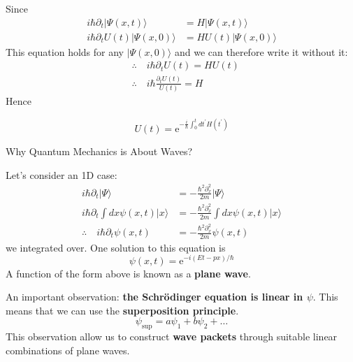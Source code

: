 Since
$$
\begin{aligned}
i \hbar \partial_{t}|\Psi(x, t)\rangle &= H|\Psi(x, t)\rangle \\
i \hbar \partial_{t} U(t)|\Psi(x, 0)\rangle &= H U(t)|\Psi(x, 0)\rangle
\end{aligned}
$$
This equation holds for any $|\Psi(x, 0)\rangle$ and we can therefore write it without it:
$$
\begin{aligned}
&\therefore \quad i \hbar \partial_{t} U(t)=H U(t)\\
&\therefore \quad i \hbar \frac{\partial_{t} U(t)}{U(t)}=H
\end{aligned}
$$
Hence
\begin{qt}
\begin{equation}
U(t)=\mathrm{e}^{-\frac{i}{\hbar} \int_{0}^{t} d t^{\prime} H\left(t^{\prime}\right)}
\end{equation}
\end{qt}
\begin{mybox}
\begin{center}
    Why Quantum Mechanics is About Waves?
\end{center}
\end{mybox}
\begin{mybox2}
Let's consider an 1D case:
$$
\begin{aligned}
i \hbar \partial_{t}|\Psi\rangle &=-\frac{\hbar^{2} \partial_{x}^{2}}{2 m}|\Psi\rangle \\
i \hbar \partial_{t} \int d x \psi(x, t)|x\rangle &=-\frac{\hbar^{2} \partial_{x}^{2}}{2 m} \int d x \psi(x, t)|x\rangle \\
\therefore \quad i \hbar \partial_{t} \psi(x, t) &=-\frac{\hbar^{2} \partial_{x}^{2}}{2 m} \psi(x, t)
\end{aligned}
$$
we integrated over. One solution to this equation is
\begin{equation}
\psi(x, t)=\mathrm{e}^{-i(E t-p x) / \hbar}
\end{equation}
A function of the form above is known as a \textbf{plane wave}.
\end{mybox2}
An important observation: \textbf{the Schrödinger equation is linear in $\psi .$} This means that we can use the \textbf{superposition principle}.
\begin{equation}
\psi_{\mathrm{sup}}=a \psi_{1}+b \psi_{2}+\ldots
\end{equation}
This observation allow us to construct \textbf{wave packets} through suitable linear combinations of plane waves. 

